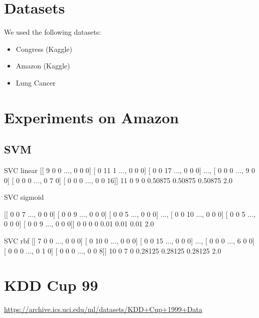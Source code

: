 \section{Datasets}
We used the following datasets:
\begin{itemize}
\item Congress (Kaggle)
\item Amazon (Kaggle)
\item Lung Cancer
\end{itemize}

\section{Experiments on Amazon}
\subsection{SVM}
SVC linear
[[ 9  0  0 ...,  0  0  0]
 [ 0 11  1 ...,  0  0  0]
 [ 0  0 17 ...,  0  0  0]
 ..., 
 [ 0  0  0 ...,  9  0  0]
 [ 0  0  0 ...,  0  7  0]
 [ 0  0  0 ...,  0  0 16]]
11 0 9 0
0.50875 0.50875 0.50875 2.0

SVC sigmoid

[[ 0  0  7 ...,  0  0  0]
 [ 0  0  9 ...,  0  0  0]
 [ 0  0  5 ...,  0  0  0]
 ..., 
 [ 0  0 10 ...,  0  0  0]
 [ 0  0  5 ...,  0  0  0]
 [ 0  0  9 ...,  0  0  0]]
0 0 0 0
0.01 0.01 0.01 2.0

SVC rbf
[[ 7  0  0 ...,  0  0  0]
 [ 0 10  0 ...,  0  0  0]
 [ 0  0 15 ...,  0  0  0]
 ..., 
 [ 0  0  0 ...,  6  0  0]
 [ 0  0  0 ...,  0  1  0]
 [ 0  0  0 ...,  0  0  8]]
10 0 7 0
0.28125 0.28125 0.28125 2.0


\section{KDD Cup 99}
\url{https://archive.ics.uci.edu/ml/datasets/KDD+Cup+1999+Data}
